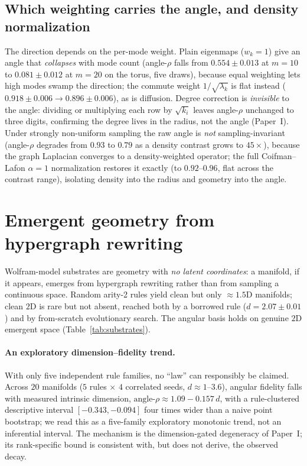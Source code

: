 \documentclass[11pt]{article}
\begin{document}
\subsection{Which weighting carries the angle, and density normalization}\label{sec:ablation}
The direction depends on the per-mode weight. Plain eigenmaps ($w_k{=}1$) give an angle
that \emph{collapses} with mode count (angle-$\rho$ falls from $0.554\pm0.013$ at
$m{=}10$ to $0.081\pm0.012$ at $m{=}20$ on the torus, five draws), because equal
weighting lets high modes swamp the direction; the commute weight
$1/\sqrt{\lambda_k}$ is flat instead ($0.918\pm0.006\to0.896\pm0.006$), as is
diffusion. Degree correction is \emph{invisible} to the angle: dividing or multiplying
each row by $\sqrt{k_i}$ leaves angle-$\rho$ unchanged to three digits, confirming the
degree lives in the radius, not the angle (Paper~I). Under strongly non-uniform sampling
the raw angle is \emph{not} sampling-invariant (angle-$\rho$ degrades from $0.93$ to
$0.79$ as a density contrast grows to $45\times$), because the graph Laplacian converges
to a density-weighted operator; the full Coifman--Lafon $\alpha{=}1$ normalization
restores it exactly (to $0.92$--$0.96$, flat across the contrast range), isolating density
into the radius and geometry into the angle.

\section{Emergent geometry from hypergraph rewriting}\label{sec:emergent}
Wolfram-model substrates are geometry with \emph{no latent coordinates}: a manifold, if it
appears, emerges from hypergraph rewriting rather than from sampling a continuous space.
Random arity-2 rules yield clean but only $\approx1.5$D manifolds; clean $2$D is rare but
not absent, reached both by a borrowed rule ($d=2.07\pm0.01$) and by from-scratch
evolutionary search. The angular basis holds on genuine $2$D emergent space
(Table~\ref{tab:substrates}).

\paragraph{An exploratory dimension--fidelity trend.} With only five independent rule
families, no ``law'' can responsibly be claimed. Across $20$ manifolds ($5$ rules $\times$
$4$ correlated seeds, $d\approx1$--$3.6$), angular fidelity falls with measured intrinsic
dimension, $\text{angle-}\rho\approx1.09-0.157\,d$, with a rule-clustered descriptive
interval $[-0.343,-0.094]$ four times wider than a naive point bootstrap; we read this as
a five-family exploratory monotonic trend, not an inferential interval. The mechanism is
the dimension-gated degeneracy of Paper~I; its rank-specific bound is consistent with, but
does not derive, the observed decay.
\end{document}
